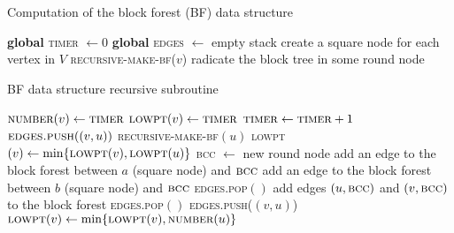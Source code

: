\documentclass{llncs}
\begin{document}
\vfill 

		\begin{algorithm}[H]
		  \small
		  \caption{\small Computation of the block forest (BF) data structure}
		  \label{algo:block forest}
		  \begin{algorithmic}[1]
		    \State \textbf{global} \textsc{timer} $\gets 0$
		    \State \textbf{global} \textsc{edges} $\gets$ empty stack
		    \State create a square node for each vertex in $V$
		    		\State \textsc{recursive-make-bf}($v$)
		    		\State radicate the block tree in some round node
		    	\EndIf
		    \EndFor
		    \EndProcedure
		  \end{algorithmic}
		\end{algorithm}

\vfill 
		\begin{algorithm}[H]
		  \small
		  \caption{\small BF data structure recursive subroutine}
		  \label{algo:recursive block forest}
		  \begin{algorithmic}[1]
		    \State $\textsc{number}(v) \gets \textsc{timer}$
		    \State $\textsc{lowpt}(v) \gets \textsc{timer}$
		   	\State $\textsc{timer} \gets \textsc{timer} + 1$
		    		\State $\textsc{edges.push}((v, u))$
		    		\State \textsc{recursive-make-bf}$(u)$
		    		\State \textsc{lowpt}$(v) \gets \min\{\textsc{lowpt}(v), \textsc{lowpt}(u)\}$
		    			\State \textsc{bcc} $\gets$ new round node
		    				\State add an edge to the block forest between $a$ (square node) and $\textsc{bcc}$
		    				\State add an edge to the block forest between $b$ (square node) and $\textsc{bcc}$
		    				\State \textsc{edges.pop}$()$
		    			\EndWhile
		    			\State add edges $(u, \textsc{bcc})$ and $(v, \textsc{bcc})$ to the block forest
		    			\State \textsc{edges.pop}$()$
		    		\EndIf
		    		 \State \textsc{edges.push}($(v, u)$)
		    		 \State $\textsc{lowpt}(v) \gets \min\{\textsc{lowpt}(v), \textsc{number}(u)\}$
		    	\EndIf
		    \EndFor
		    \EndProcedure
		  \end{algorithmic}
		\end{algorithm}
\end{document}
